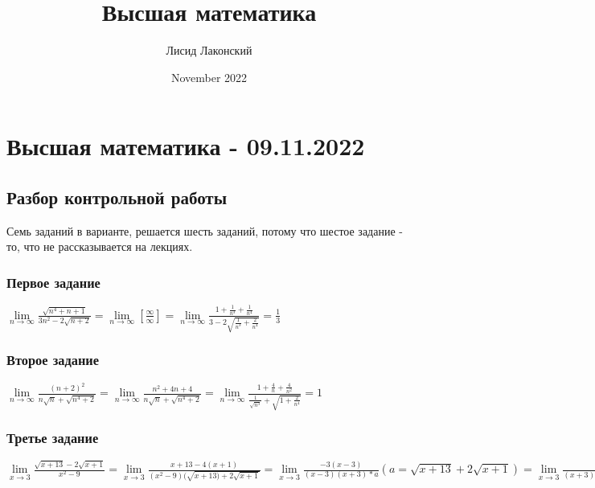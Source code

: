 \documentclass{article}
\title{Высшая математика}
\author{Лисид Лаконский}
\date{November 2022}
\begin{document}
\maketitle

\tableofcontents
\pagebreak

\section{Высшая математика - 09.11.2022}

\subsection{Разбор контрольной работы}

\begin{flushleft}

Семь заданий в варианте, решается шесть заданий, потому что шестое задание - то, что не рассказывается на лекциях.

\subsubsection{Первое задание}

$
\lim\limits_{n \to \infty} \frac{\sqrt{n^4 + n + 1}}{3n^2 - 2\sqrt{n + 2}}
=
\lim\limits_{n \to \infty} [ \frac{\infty}{\infty} ]
=
\lim\limits_{n \to \infty} \frac{1 + \frac{1}{n^3} + \frac{1}{n^4}}{3 - 2 \sqrt { \frac{1}{n^3} + \frac{2}{n^4}}}
=
\frac{1}{3}
$

\subsubsection{Второе задание}

$
\lim\limits_{n \to \infty} \frac{(n + 2)^2}{n\sqrt{n} + \sqrt{n^4 + 2}}
=
\lim\limits_{n \to \infty} \frac{n^2 + 4n + 4}{n\sqrt{n} + \sqrt{n^4 + 2}}
=
\lim\limits_{n \to \infty} \frac{1 + \frac{4}{n} + \frac{4}{n^2}}{\frac{1}{\sqrt{n^3}} + \sqrt{1 + \frac{2}{n^4}}}
=
1
$

\subsubsection{Третье задание}

$
\lim\limits_{x \to 3} \frac{\sqrt{x + 13} - 2\sqrt{x + 1}}{x^2 - 9}
=
\lim\limits_{x \to 3} \frac{x + 13 - 4(x + 1)}{(x^2 - 9)(\sqrt{x + 13) + 2\sqrt{x + 1}}}
=
\lim\limits_{x \to 3} \frac{-3(x - 3)}{(x-3)(x+3)*a} (a = \sqrt{x+13} + 2\sqrt{x + 1})
=
\lim\limits_{x \to 3} \frac{-3}{(x + 3)(\sqrt{x + 13} + 2\sqrt{x + 1}}
=
-\frac{1}{16}
$


\end{flushleft}
\end{document}
